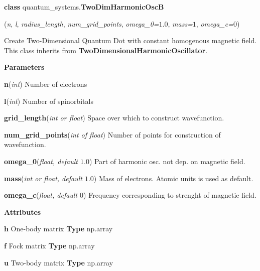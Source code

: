 
\begin{tcolorbox}
    {\selectfont
    \textbf{class} quantum\_systems.\textbf{TwoDimHarmonicOscB}

    \hspace{1em}(\emph{n}, \emph{l}, \emph{radius\_length}, \emph{num\_grid\_points}, 
    \emph{omega\_0=$1.0$}, \emph{mass=$1$}, \emph{omega\_c=$0$})

    \vspace{1em}
    Create Two-Dimensional Quantum Dot with constant homogenous magnetic field.
    This class inherits from \textbf{TwoDimensionalHarmonicOscillator}.
    \vspace{1em}

    \textbf{Parameters}

    \hspace{2em}\textbf{n}(\emph{int}) Number of electrons
    
    \hspace{2em}\textbf{l}(\emph{int}) Number of spinorbitals
    
    \hspace{2em}\textbf{grid\_length}(\emph{int or float}) Space over which to 
        construct wavefunction.
    
    \hspace{2em}\textbf{num\_grid\_points}(\emph{int of float}) Number of 
        points for construction of wavefunction.

    \hspace{1em}\textbf{omega\_0}(\emph{float, default $1.0$}) Part of harmonic 
        osc. not dep. on magnetic field. 
    
    \hspace{2em}\textbf{mass}(\emph{int or float, default $1.0$}) Mass of electrons.
        Atomic units is used as default.
    
    \hspace{2em}\textbf{omega\_c}(\emph{float, default $0$}) Frequency corresponding 
        to strenght of magnetic field.

    \vspace{1em}
    \textbf{Attributes}

    \hspace{2em} \textbf{h}
    One-body matrix 
    \textbf{Type} np.array
    
    \hspace{2em} \textbf{f}
    Fock matrix
    \textbf{Type} np.array

    \hspace{2em} \textbf{u}
    Two-body matrix
    \textbf{Type} np.array

}
\end{tcolorbox}
